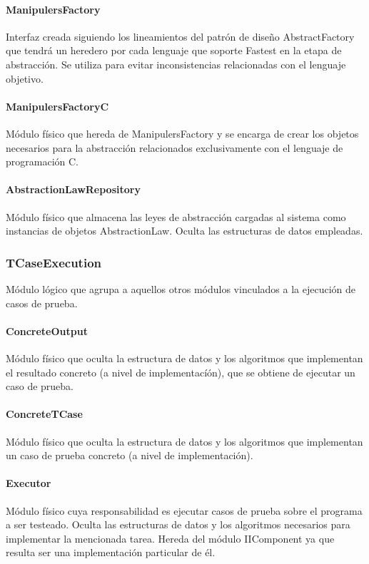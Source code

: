 \documentclass[a4paper,10pt]{report}
\begin{document}
				\paragraph{ManipulersFactory}
				Interfaz creada siguiendo los lineamientos del patrón de diseño AbstractFactory que tendrá un heredero por cada lenguaje que soporte Fastest en la etapa de abstracción. Se utiliza para evitar inconsistencias relacionadas con el lenguaje objetivo.
				\paragraph{ManipulersFactoryC}
				Módulo físico que hereda de ManipulersFactory y se encarga de crear los objetos necesarios para la abstracción relacionados exclusivamente con el lenguaje de programación C.
				\paragraph{AbstractionLawRepository}
				Módulo físico que almacena las leyes de abstracción cargadas al sistema como instancias de objetos AbstractionLaw.
				Oculta las estructuras de datos empleadas.
			\subsubsection{TCaseExecution}
			Módulo lógico que agrupa a aquellos otros módulos vinculados a la ejecución de casos de prueba.
				\paragraph{ConcreteOutput}
				Módulo físico que oculta la estructura de datos y los algoritmos que implementan el resultado concreto (a nivel de implementacíón), que se obtiene de ejecutar un caso de prueba.
				\paragraph{ConcreteTCase}
				Módulo físico que oculta la estructura de datos y los algoritmos que implementan un caso de prueba concreto (a nivel de implementación).
				\paragraph{Executor}
				Módulo físico cuya responsabilidad es ejecutar casos de prueba sobre el programa a ser testeado. Oculta las estructuras de datos y los algoritmos necesarios para implementar la mencionada tarea. Hereda del módulo IIComponent ya que resulta ser una implementación particular de él.
\end{document}
